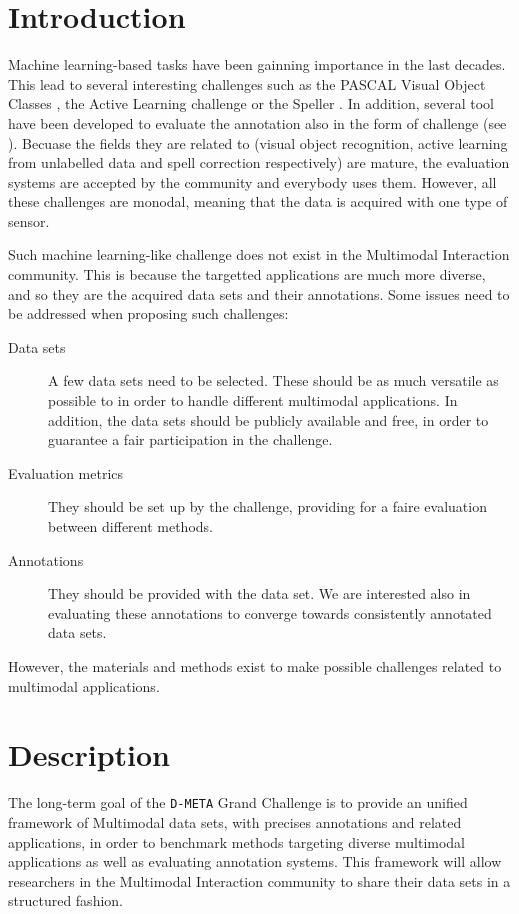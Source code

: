 \documentclass{sig-alternate}
\begin{document}
\section{Introduction}
Machine learning-based tasks have been gainning importance in the last decades. This lead to several interesting
challenges such as the PASCAL Visual Object Classes \cite{PascalVOC}, the Active Learning challenge
\cite{ActiveLearning} or the Speller \cite{Speller}. In addition, several tool have been developed to evaluate the
annotation also in the form of challenge (see \cite{Give}). Becuase the fields they are related to (visual object
recognition, active learning from unlabelled data and spell correction respectively) are mature, the evaluation systems
are accepted by the community and everybody uses them. However, all these challenges are monodal, meaning that the data
is acquired with one type of sensor.\vspace{0.3cm}

Such machine learning-like challenge does not exist in the Multimodal Interaction community. This is because the
targetted applications are much more diverse, and so they are the acquired data sets and their annotations. Some issues
need to be addressed when proposing such challenges:
\begin{description}
 \item [Data sets] A few data sets need to be selected. These should be as much versatile as possible to in order to
handle different multimodal applications. In addition, the data sets should be publicly available and free, in order to
guarantee a fair participation in the challenge.
 \item [Evaluation metrics] They should be set up by the challenge, providing for a faire evaluation between different
methods.
 \item [Annotations] They should be provided with the data set. We are interested also in evaluating these annotations
to converge towards consistently annotated data sets.
\end{description}
However, the materials and methods exist to make possible challenges related to multimodal applications.\vspace{0.3cm}




\section{Description}
The long-term goal of the \texttt{D-META} Grand Challenge is to provide an unified framework of Multimodal data sets,
with precises annotations and related applications, in order to benchmark methods targeting diverse multimodal
applications as well as evaluating annotation systems. This framework will allow researchers in the Multimodal
Interaction community to share their data sets in a structured fashion.\vspace{0.3cm}
\end{document}
